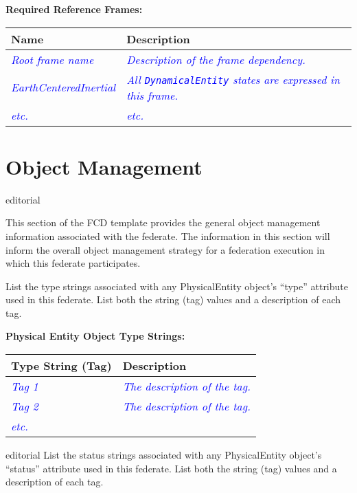 \documentclass[11pt,english,letterpaper]{article}
\newcommand{\example}[1]{{\textcolor{blue}{\textit{#1}}}}
\begin{document}
\textbf{Required Reference Frames: }

\begin{tabularx}{\textwidth}{|l|X|} \hline
Name & Description \\ \hline
\example{Root frame name} &
\example{Description of the frame dependency.} \\ \hline
\example{EarthCenteredInertial} &
\example{All \texttt{DynamicalEntity} states are expressed in this frame.} \\ \hline
\example{etc.} &
\example{etc.} \\ \hline
\end{tabularx}


\section*{Object Management}

\begin{shownto}{editorial}
{\color{red} This section of the FCD template provides the general object
management information associated with the federate. The information in this
section will inform the overall object management strategy for a federation
execution in which this federate participates.

List the type strings associated with any PhysicalEntity object's ``type''
attribute used in this federate. List both the string (tag) values and a
description of each tag.}
\end{shownto}

\textbf{Physical Entity Object Type Strings: }

\begin{tabularx}{\textwidth}{|l|X|} \hline
Type String (Tag) & Description \\ \hline
\example{Tag 1} & \example{The description of the tag.} \\ \hline
\example{Tag 2} & \example{The description of the tag.} \\ \hline
\example{etc.} & \\ \hline
\end{tabularx}

\begin{shownto}{editorial}
{\color{red} List the status strings associated with any PhysicalEntity
object's ``status'' attribute used in this federate. List both the string (tag)
values and a description of each tag.}
\end{shownto}
\end{document}
